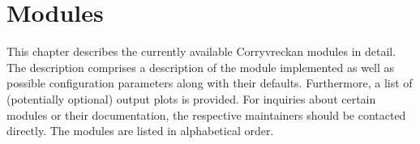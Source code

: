 \chapter{Modules}
\label{ch:modules}

This chapter describes the currently available Corryvreckan modules in detail.
The description comprises a description of the module implemented as well as possible configuration parameters along with their defaults.
Furthermore, a list of (potentially optional) output plots is provided.
For inquiries about certain modules or their documentation, the respective maintainers should be contacted directly.
The modules are listed in alphabetical order.
